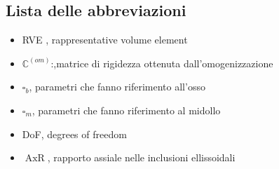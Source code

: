 \documentclass[a4paper,num-refs]{oup-contemporary}
\begin{document}
\subsection{Lista delle abbreviazioni}

\begin{itemize}
	\item RVE , rappresentative volume element 
	\item $\mathbb C^{(om)}$:,matrice di rigidezza ottenuta dall'omogenizzazione
	\item $\square_b$, parametri che fanno riferimento all'osso
	\item $\square_m$, parametri che fanno riferimento al midollo
	\item DoF, degrees of freedom
	\item $\operatorname{AxR}$, rapporto assiale nelle inclusioni ellissoidali
\end{itemize}
 


\end{document}
